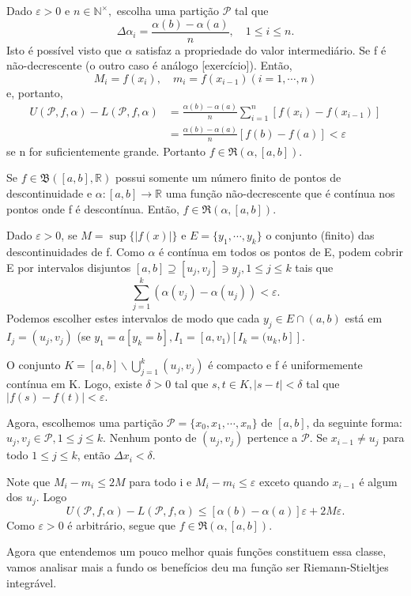 \documentclass[analysis_notes.tex]{subfiles}
\begin{document}
\begin{proof*}
	Dado \(\varepsilon >0\) e \(n\in \mathbb{N}^{\times},\) escolha uma parti\c cão \(\mathcal{P}\) tal que
	\[
		\Delta \alpha_{i} = \frac{\alpha (b) - \alpha (a)}{n},\quad 1\leq i\leq n.
	\]
	Isto é possível visto que \(\alpha \) satisfaz a propriedade do valor intermediário. Se
	f é não-decrescente (o outro caso é análogo [exercício]). Então,
	\[
		M_{i}=f(x_{i}),\quad m_{i}=f(x_{i-1}) (i=1, \cdots, n)
	\]
	e, portanto,
	\begin{align*}
		U(\mathcal{P}, f, \alpha ) - L(\mathcal{P}, f, \alpha ) & = \frac{\alpha (b) - \alpha (a)}{n}\sum\limits_{i=1}^{n}[f(x_{i})-f(x_{i-1})] \\
		                                                        & = \frac{\alpha (b) - \alpha (a)}{n}[f(b)-f(a)] < \varepsilon
	\end{align*}
	se n for suficientemente grande. Portanto \(f\in \mathfrak{R}(\alpha, [a,b])\). \qedsymbol
\end{proof*}
\begin{theorem*}
	Se \(f\in \mathfrak{B}([a, b], \mathbb{R})\) possui somente um número finito de pontos de
	descontinuidade e \(\alpha :[a, b]\rightarrow \mathbb{R}\) uma fun\c cão não-decrescente que é
	contínua nos pontos onde f é descontínua. Então, \(f\in \mathfrak{R}(\alpha , [a, b]).\)
\end{theorem*}
\begin{proof*}
	Dado \(\varepsilon >0\), se \(M=\sup\{|f(x)|\}\) e \(E = \{y_{1}, \cdots, y_{k}\}\) o
	conjunto (finito) das descontinuidades de f. Como \(\alpha \) é contínua em todos os
	pontos de E, podem cobrir E por intervalos disjuntos \([a, b]\supseteq{[u_{j}, v_{j}]}\ni y_{j}, 1\leq j\leq k\)  tais que
	\[
		\sum\limits_{j=1}^{k}(\alpha (v_{j})-\alpha (u_{j})) < \varepsilon .
	\]
	Podemos escolher estes intervalos de modo que cada \(y_{j}\in E\cap{(a, b)}\) está em \(I_{j}=(u_{j}, v_{j})\)
	(se \(y_{1}=a[y_{k}=b], I_{1}=[a, v_{1})[I_{k}=(u_{k}, b]].\)

	O conjunto \(K=[a, b]\backslash{\bigcup_{j=1}^{k}{(u_{j},v_{j})}}\) é compacto e f é uniformemente
	contínua em K. Logo, existe \(\delta >0\) tal que \(s, t\in K, |s-t| < \delta \) tal que
	\(|f(s) - f(t)| < \varepsilon .\)

	Agora, escolhemos uma parti\c cão \(\mathcal{P} = \{x_{0}, x_{1}, \cdots, x_{n}\}\) de \([a, b]\), da
	seguinte forma: \(u_{j}, v_{j}\in \mathcal{P}, 1\leq j\leq k.\) Nenhum ponto
	de \((u_{j}, v_{j})\) pertence a \(\mathcal{P}\). Se \(x_{i-1}\neq u_{j}\) para todo \(1\leq j\leq k\), então
	\(\Delta x_{i} < \delta.\)

	Note que \(M_{i}-m_{i}\leq 2M\) para todo i e \(M_{i} - m_{i}\leq \varepsilon \) exceto quando
	\(x_{i-1}\) é algum dos \(u_{j}.\) Logo
	\[
		U(\mathcal{P}, f, \alpha ) - L(\mathcal{P}, f, \alpha )\leq [\alpha (b) - \alpha (a)]\varepsilon  + 2M\varepsilon.
	\]
	Como \(\varepsilon >0\) é arbitrário, segue que \(f\in \mathfrak{R}(\alpha , [a, b])\). \qedsymbol
\end{proof*}
Agora que entendemos um pouco melhor quais fun\c cões constituem essa classe, vamos
analisar mais a fundo os benefícios deu ma fun\c cão ser Riemann-Stieltjes integrável.
\end{document}
